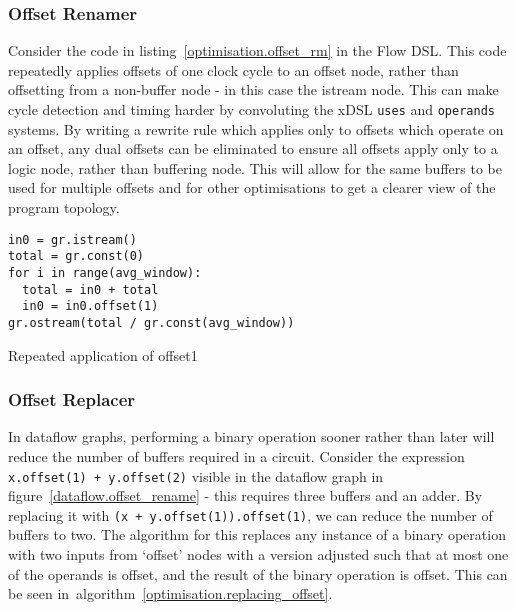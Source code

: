 \subsubsection{Offset Renamer}
Consider the code in listing \ref{optimisation.offset_rm} in the Flow DSL. This code repeatedly applies offsets of one clock cycle to an offset node, rather than offsetting from a non-buffer node \hyphen{} in this case the istream node. This can make cycle detection and timing harder by convoluting the xDSL \lstinline|uses| and \lstinline|operands| systems. By writing a rewrite rule which applies only to offsets which operate on an offset, any dual offsets can be eliminated to ensure all offsets apply only to a logic node, rather than buffering node. This will allow for the same buffers to be used for multiple offsets and for other optimisations to get a clearer view of the program topology.

\renewcommand\theFancyVerbLine{\arabic{FancyVerbLine}}
\begin{listing}[H]
  \begin{verbatim}
in0 = gr.istream()
total = gr.const(0)
for i in range(avg_window):
  total = in0 + total
  in0 = in0.offset(1)
gr.ostream(total / gr.const(avg_window))
  \end{verbatim}
  \caption{Repeated application of offset1}\label{optimisation.offset_rm}
\end{listing}

\subsubsection{Offset Replacer}
In dataflow graphs, performing a binary operation sooner rather than later will reduce the number of buffers required in a circuit. Consider the expression \lstinline|x.offset(1) + y.offset(2)| visible in the dataflow graph in figure \ref{dataflow.offset_rename} \hyphen{} this requires three buffers and an adder. By replacing it with \lstinline|(x + y.offset(1)).offset(1)|, we can reduce the number of buffers to two. The algorithm for this replaces any instance of a binary operation with two inputs from `offset' nodes with a version adjusted such that at most one of the operands is offset, and the result of the binary operation is offset. This can be seen in algorithm \ref{optimisation.replacing_offset}.

